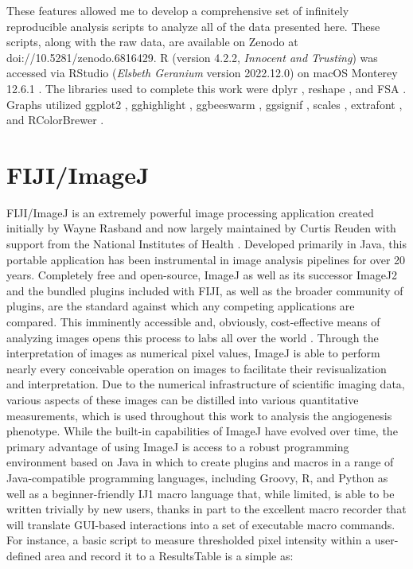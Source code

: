 These features allowed me to develop a comprehensive set of infinitely reproducible analysis scripts to analyze all of the data presented here. These scripts, along with the raw data, are available on Zenodo at doi://10.5281/zenodo.6816429. R (version 4.2.2, \textit{Innocent and Trusting}) was accessed via RStudio (\textit{Elsbeth Geranium} version 2022.12.0) on macOS Monterey 12.6.1 \citep{RCoreTeam2022, RStudioTeam2022}. The libraries used to complete this work were dplyr \citep{Wickham2022d}, reshape \citep{Wickham2022a}, and FSA \citep{Ogle2022}. Graphs utilized ggplot2 \citep{Wickham2009, Wickham2016, Wickham2022b}, gghighlight \citep{Yutani2022}, ggbeeswarm \citep{Clarke2017}, ggsignif \citep{AhlmannEltze2021}, scales \citep{Wickham2022c}, extrafont \citep{Chang2022}, and RColorBrewer \citep{Neuwirth2022}.

\section{FIJI/ImageJ}\label{imagej}

FIJI/ImageJ is an extremely powerful image processing application created initially by Wayne Rasband and now largely maintained by Curtis Reuden with support from the National Institutes of Health \citep{Schneider2012}. Developed primarily in Java, this portable application has been instrumental in image analysis pipelines for over 20 years. Completely free and open-source, ImageJ as well as its successor ImageJ2 and the bundled plugins included with FIJI, as well as the broader community of plugins, are the standard against which any competing applications are compared. This imminently accessible and, obviously, cost-effective means of analyzing images opens this process to labs all over the world \citep{Girish2004}. Through the interpretation of images as numerical pixel values, ImageJ is able to perform nearly every conceivable operation on images to facilitate their revisualization and interpretation. Due to the numerical infrastructure of scientific imaging data, various aspects of these images can be distilled into various quantitative measurements, which is used throughout this work to analysis the angiogenesis phenotype. While the built-in capabilities of ImageJ have evolved over time, the primary advantage of using ImageJ is access to a robust programming environment based on Java in which to create plugins and macros in a range of Java-compatible programming languages, including Groovy, R, and Python as well as a beginner-friendly IJ1 macro language that, while limited, is able to be written trivially by new users, thanks in part to the excellent macro recorder that will translate GUI-based interactions into a set of executable macro commands. For instance, a basic script to measure thresholded pixel intensity within a user-defined area and record it to a ResultsTable is a simple as:
 
